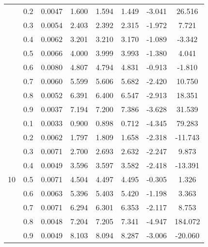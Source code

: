\documentclass[11pt,a4paper]{report}
\begin{document}
\begin{longtable}{ | c | c || c | c | c | c | c | c | }
 & 0.2 & 0.0047 & 1.600 & 1.594 & 1.449 & -3.041 & 26.516 \\
 & 0.3 & 0.0054 & 2.403 & 2.392 & 2.315 & -1.972 & 7.721 \\
 & 0.4 & 0.0062 & 3.201 & 3.210 & 3.170 & -1.089 & -3.342 \\
 & 0.5 & 0.0066 & 4.000 & 3.999 & 3.993 & -1.380 & 4.041 \\
 & 0.6 & 0.0080 & 4.807 & 4.794 & 4.831 & -0.913 & -1.810 \\
 & 0.7 & 0.0060 & 5.599 & 5.606 & 5.682 & -2.420 & 10.750 \\
 & 0.8 & 0.0052 & 6.391 & 6.400 & 6.547 & -2.913 & 18.351 \\
 & 0.9 & 0.0037 & 7.194 & 7.200 & 7.386 & -3.628 & 31.539 \\
 \hline
\multirow{9}{*}{10} & 0.1 & 0.0033 & 0.900 & 0.898 & 0.712 & -4.345 & 79.283 \\
 & 0.2 & 0.0062 & 1.797 & 1.809 & 1.658 & -2.318 & -11.743 \\
 & 0.3 & 0.0071 & 2.700 & 2.693 & 2.632 & -2.247 & 9.873 \\
 & 0.4 & 0.0049 & 3.596 & 3.597 & 3.582 & -2.418 & -13.391 \\
 & 0.5 & 0.0071 & 4.504 & 4.497 & 4.495 & -0.305 & 1.326 \\
 & 0.6 & 0.0063 & 5.396 & 5.403 & 5.420 & -1.198 & 3.363 \\
 & 0.7 & 0.0071 & 6.294 & 6.301 & 6.353 & -2.117 & 8.753 \\
 & 0.8 & 0.0048 & 7.204 & 7.205 & 7.341 & -4.947 & 184.072 \\
 & 0.9 & 0.0049 & 8.103 & 8.094 & 8.287 & -3.006 & -20.060 \\
 \hline
\hline
\end{longtable}
\end{document}
